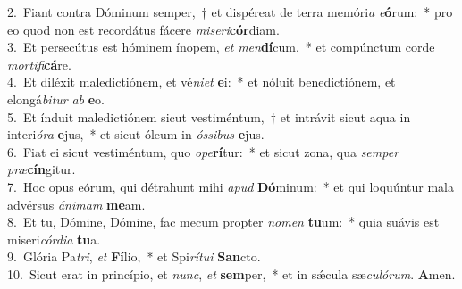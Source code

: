{2.~}Fiant contra Dóminum semper,~† et dispéreat de terra memóri\textit{a} \textit{e}\textbf{ó}rum:~* pro eo quod non est recordátus fácere \textit{mi}\textit{se}\textit{ri}\textbf{cór}diam.\\
{3.~}Et persecútus est hóminem ínopem, \textit{et} \textit{men}\textbf{dí}cum,~* et compúnctum corde \textit{mor}\textit{ti}\textit{fi}\textbf{cá}re.\\
{4.~}Et diléxit maledictiónem, et vé\textit{ni}\textit{et} \textbf{e}i:~* et nóluit benedictiónem, et elongá\textit{bi}\textit{tur} \textit{ab} \textbf{e}o.\\
{5.~}Et índuit maledictiónem sicut vestiméntum,~† et intrávit sicut aqua in interi\textit{ó}\textit{ra} \textbf{e}jus,~* et sicut óleum in \textit{ós}\textit{si}\textit{bus} \textbf{e}jus.\\
{6.~}Fiat ei sicut vestiméntum, quo \textit{o}\textit{pe}\textbf{rí}tur:~* et sicut zona, qua \textit{sem}\textit{per} \textit{præ}\textbf{cín}gitur.\\
{7.~}Hoc opus eórum, qui détrahunt mihi \textit{a}\textit{pud} \textbf{Dó}minum:~* et qui loquúntur mala advérsus \textit{á}\textit{ni}\textit{mam} \textbf{me}am.\\
{8.~}Et tu, Dómine, Dómine, fac mecum propter \textit{no}\textit{men} \textbf{tu}um:~* quia suávis est miseri\textit{cór}\textit{di}\textit{a} \textbf{tu}a.\\
{9.~}Glória Pa\textit{tri}, \textit{et} \textbf{Fí}lio,~* et Spi\textit{rí}\textit{tu}\textit{i} \textbf{San}cto.\\
{10.~}Sicut erat in princípio, et \textit{nunc}, \textit{et} \textbf{sem}per,~* et in sǽcula sæ\textit{cu}\textit{ló}\textit{rum}. \textbf{A}men.\\
